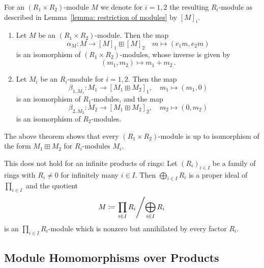 

\begin{definition}
  For an $(R_1 \times R_2)$-module $M$ we denote for $i = 1, 2$ the resulting $R_i$-module as described in Lemma~\ref{lemma: restriction of modules} by $[M]_i$.
\end{definition}


\begin{theorem}
  \label{theorem: equivalence of modules for objects}
  \leavevmode
  \begin{enumerate}
    \item
      Let $M$ be an $(R_1 \times R_2)$-module.
      Then the map
      \[
                \alpha_M
        \colon  M
        \to     [M]_1 \boxplus [M]_2
        \quad   m
        \mapsto (e_1 m, e_2 m)
      \]
      is an isomorphism of $(R_1 \times R_2)$-modules, whose inverse is given by
      \[
                (m_1, m_2)
        \mapsto m_1 + m_2 \,.
      \]
    \item
      Let $M_i$ be an $R_i$-module for $i = 1, 2$.
      Then the map
      \[
                \beta_{1, M_1}
        \colon  M_1
        \to     [M_1 \boxplus M_2]_1,
        \quad   m_1
        \mapsto (m_1, 0)
      \]
      is an isomorphism of $R_1$-modules, and the map
      \[
                \beta_{2, M_2}
        \colon  M_2
        \to     [M_1 \boxplus M_2]_2,
        \quad   m_2
        \mapsto (0, m_2)
      \]
      is an isomorphism of $R_2$-modules.
  \end{enumerate}
\end{theorem}




\begin{remark}
  The above theorem shows that every $(R_1 \times R_2)$-module is up to isomorphism of the form $M_1 \boxplus M_2$ for $R_i$-modules $M_i$.
  
  This does not hold for an infinite products of rings:
  Let $(R_i)_{i \in I}$ be a family of rings with $R_i \neq 0$ for infinitely many $i \in I$.
  Then $\bigoplus_{i \in I} R_i$ is a proper ideal of $\prod_{i \in I}$ and the quotient
  \[
              M
    \coloneqq \left. \prod_{i \in I} R_i \middle/ \bigoplus_{i \in I} R_i \right.
  \]
  is an $\prod_{i \in I} R_i$-module which is nonzero but annihilated by every factor $R_i$.
\end{remark}




\subsection{Module Homomorphisms over Products}


